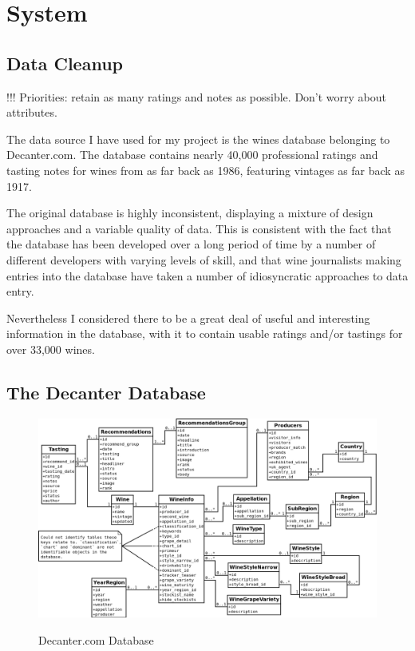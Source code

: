 \section{System}\label{design}

\subsection{Data Cleanup}

!!! Priorities: retain as many ratings and notes as possible. Don't worry about attributes.

The data source I have used for my project is the wines database belonging to Decanter.com\cite{DecanterCom}. The database contains nearly 40,000 professional ratings and tasting notes for wines from as far back as 1986, featuring vintages as far back as 1917.

The original database is highly inconsistent, displaying a mixture of design approaches and a variable quality of data. This is consistent with the fact that the database has been developed over a long period of time by a number of different developers with varying levels of skill, and that wine journalists making entries into the database have taken a number of idiosyncratic approaches to data entry.

Nevertheless I considered there to be a great deal of useful and interesting information in the database, with it to contain usable ratings and/or tastings for over 33,000 wines.

\subsection{The Decanter Database}

\begin{figure}[h!]
    \caption{Decanter.com Database}
    \centering
        \includegraphics[width=14cm]{DecanterWineDB}
    \label{fig:decanterdb}
\end{figure}

